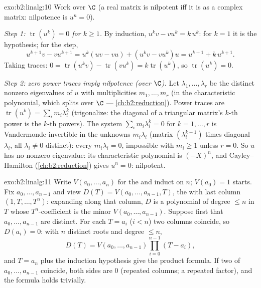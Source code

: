 \begin{solution}{exo:b2:linalg:10}
Work over $\C$ (a real matrix is nilpotent iff it is as a complex
matrix: nilpotence is $u^n = 0$).

\emph{Step 1: $\operatorname{tr}(u^k) = 0$ for $k \geq 1$.} By
induction, $u^k v - v u^k = k\, u^k$: for $k = 1$ it is the
hypothesis; for the step,
\[
u^{k+1}v - vu^{k+1} = u^k(uv - vu) + (u^k v - v u^k)u
= u^{k+1} + k\,u^{k+1} .
\]
Taking traces: $0 = \operatorname{tr}(u^k v) -
\operatorname{tr}(vu^k) = k \operatorname{tr}(u^k)$, so
$\operatorname{tr}(u^k) = 0$.

\emph{Step 2: zero power traces imply nilpotence (over $\C$).} Let
$\lambda_1, \dots, \lambda_r$ be the distinct nonzero eigenvalues of
$u$ with multiplicities $m_1, \dots, m_r$ (in the characteristic
polynomial, which splits over $\C$ ---
\cref{ch:b2:reduction}). Power traces are $\operatorname{tr}(u^k) =
\sum_i m_i \lambda_i^k$ (trigonalize: the diagonal of a triangular
matrix's $k$-th power is the $k$-th powers). The system $\sum_i m_i
\lambda_i^k = 0$ for $k = 1, \dots, r$ is Vandermonde-invertible in
the unknowns $m_i\lambda_i$ (matrix $(\lambda_i^{k-1})$ times
diagonal $\lambda_i$, all $\lambda_i \neq 0$ distinct): every $m_i
\lambda_i = 0$, impossible with $m_i \geq 1$ unless $r = 0$. So $u$
has no nonzero eigenvalue: its characteristic polynomial is
$(-X)^n$, and Cayley--Hamilton (\cref{ch:b2:reduction}) gives $u^n
= 0$: nilpotent.
\end{solution}

\begin{solution}{exo:b2:linalg:11}
Write $V(a_0, \dots, a_n)$ for the  and induct on $n$;
$V(a_0) = 1$ starts. Fix $a_0, \dots, a_{n-1}$ and view $D(T) =
V(a_0, \dots, a_{n-1}, T)$, the  with last column $(1,
T, \dots, T^n)$: expanding along that column, $D$ is a polynomial
of degree $\leq n$ in $T$ whose $T^n$-coefficient is the minor
$V(a_0, \dots, a_{n-1})$. Suppose first that $a_0, \dots,
a_{n-1}$ are distinct. For each $T = a_i$ ($i < n$) two columns
coincide, so $D(a_i) = 0$: with $n$ distinct roots and degree
$\leq n$,
\[
D(T) = V(a_0, \dots, a_{n-1}) \prod_{i=0}^{n-1}(T - a_i),
\]
and $T = a_n$ plus the induction hypothesis give the product
formula. If two of $a_0, \dots, a_{n-1}$ coincide, both sides are
$0$ (repeated columns; a repeated factor), and the formula holds
trivially.
\end{solution}

